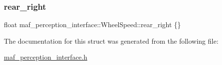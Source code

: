 \subsubsection{\texorpdfstring{rear\+\_\+right}{rear\_right}}
{\footnotesize\ttfamily float maf\+\_\+perception\+\_\+interface\+::\+Wheel\+Speed\+::rear\+\_\+right \{\}}



The documentation for this struct was generated from the following file\+:\begin{DoxyCompactItemize}
\item 
\hyperlink{maf__perception__interface_8h}{maf\+\_\+perception\+\_\+interface.\+h}\end{DoxyCompactItemize}

